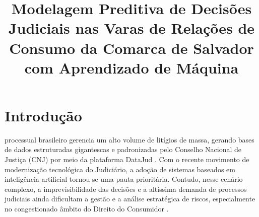 \documentclass[conference]{IEEEtran}
\begin{document}
\title{Modelagem Preditiva de Decisões Judiciais nas Varas de Relações de Consumo da Comarca de Salvador com Aprendizado de Máquina}

\author{
    \and
}

\maketitle


\section{Introdução}
 processual brasileiro gerencia um alto volume de litígios de massa, gerando bases de dados estruturadas gigantescas e padronizadas pelo Conselho Nacional de Justiça (CNJ) por meio da plataforma DataJud \cite{cnj_datajud}. Com o recente movimento de modernização tecnológica do Judiciário, a adoção de sistemas baseados em inteligência artificial tornou-se uma pauta prioritária. Contudo, nesse cenário complexo, a imprevisibilidade das decisões e a altíssima demanda de processos judiciais ainda dificultam a gestão e a análise estratégica de riscos, especialmente no congestionado âmbito do Direito do Consumidor \cite{lage2022, bertalan2020}.
\end{document}
